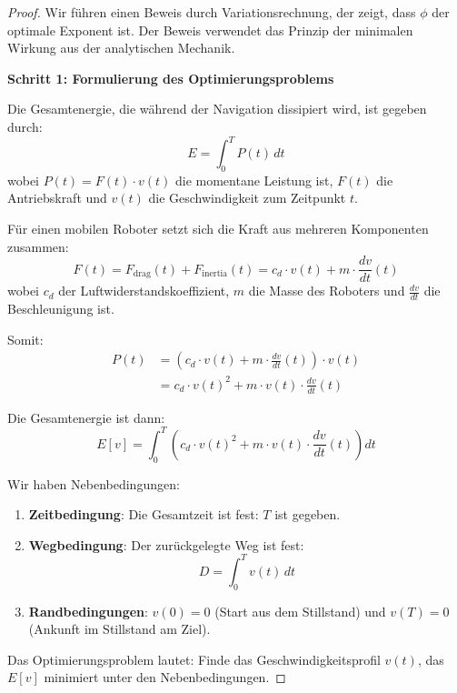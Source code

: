 ﻿\documentclass[a4paper,12pt]{article}
\theoremstyle{definition}
\begin{document}
\begin{proof}
Wir führen einen Beweis durch Variationsrechnung, der zeigt, dass $\phi$ der optimale Exponent ist. Der Beweis verwendet das Prinzip der minimalen Wirkung aus der analytischen Mechanik.

\textbf{Schritt 1: Formulierung des Optimierungsproblems}

Die Gesamtenergie, die während der Navigation dissipiert wird, ist gegeben durch:
\begin{equation}
E = \int_0^T P(t) \, dt
\end{equation}
wobei $P(t) = F(t) \cdot v(t)$ die momentane Leistung ist, $F(t)$ die Antriebskraft und $v(t)$ die Geschwindigkeit zum Zeitpunkt $t$.

Für einen mobilen Roboter setzt sich die Kraft aus mehreren Komponenten zusammen:
\begin{equation}
F(t) = F_{\text{drag}}(t) + F_{\text{inertia}}(t) = c_d \cdot v(t) + m \cdot \frac{dv}{dt}(t)
\end{equation}
wobei $c_d$ der Luftwiderstandskoeffizient, $m$ die Masse des Roboters und $\frac{dv}{dt}$ die Beschleunigung ist.

Somit:
\begin{align}
P(t) &= \left(c_d \cdot v(t) + m \cdot \frac{dv}{dt}(t)\right) \cdot v(t) \\
&= c_d \cdot v(t)^2 + m \cdot v(t) \cdot \frac{dv}{dt}(t)
\end{align}

Die Gesamtenergie ist dann:
\begin{equation}
E[v] = \int_0^T \left(c_d \cdot v(t)^2 + m \cdot v(t) \cdot \frac{dv}{dt}(t)\right) dt
\end{equation}

Wir haben Nebenbedingungen:
\begin{enumerate}
\item \textbf{Zeitbedingung}: Die Gesamtzeit ist fest: $T$ ist gegeben.
\item \textbf{Wegbedingung}: Der zurückgelegte Weg ist fest:
\begin{equation}
D = \int_0^T v(t) \, dt
\end{equation}
\item \textbf{Randbedingungen}: $v(0) = 0$ (Start aus dem Stillstand) und $v(T) = 0$ (Ankunft im Stillstand am Ziel).
\end{enumerate}

Das Optimierungsproblem lautet: Finde das Geschwindigkeitsprofil $v(t)$, das $E[v]$ minimiert unter den Nebenbedingungen.


\end{proof}
\end{document}
